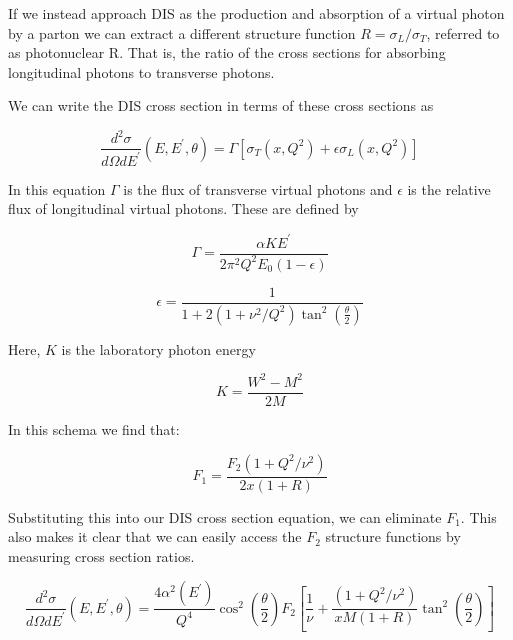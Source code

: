 If we instead approach DIS as the production and absorption of a virtual photon by a parton we can extract a different structure function $R=\sigma_L/\sigma_T$, referred to as photonuclear R. That is, the ratio of the cross sections for absorbing longitudinal photons to transverse photons.

We can write the DIS cross section in terms of these cross sections as

\begin{equation}
	\frac{d^2\sigma}{d\Omega dE^\prime}\left(E,E^\prime,\theta\right) = \Gamma\left[\sigma_T\left(x,Q^2\right)+\epsilon\sigma_L\left(x,Q^2\right)\right]
\end{equation}

In this equation $\Gamma$ is the flux of transverse virtual photons and $\epsilon$ is the relative flux of longitudinal virtual photons. These are defined by

\begin{equation}
	\Gamma = \frac{\alpha KE^\prime}{2\pi^2Q^2E_0\left(1-\epsilon\right)}
\end{equation}

\begin{equation}
	\epsilon = \frac{1}{1+2\left(1+\nu^2/Q^2\right)\tan^2\left(\frac{\theta}{2}\right)}
\end{equation}

Here, $K$ is the laboratory photon energy

\begin{equation}
	K = \frac{W^2-M^2}{2M}
\end{equation}

In this schema we find that:

\begin{equation}
	F_1 = \frac{F_2\left(1+Q^2/\nu^2\right)}{2x\left(1+R\right)}
\end{equation}

Substituting this into our DIS cross section equation, we can eliminate $F_1$. This also makes it clear that we can easily access the $F_2$ structure functions by measuring cross section ratios.

\begin{equation}
	\frac{d^2\sigma}{d\Omega dE^\prime}\left(E,E^\prime,\theta\right) = \frac{4\alpha^2\left(E^\prime\right)}{Q^4}\cos^2\left(\frac{\theta}{2}\right)F_2\left[\frac{1}{\nu}+\frac{\left(1+Q^2/\nu^2\right)}{xM\left(1+R\right)}\tan^2\left(\frac{\theta}{2}\right)\right]
\end{equation}

